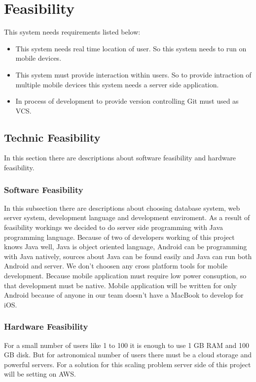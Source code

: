 \chapter{Feasibility}
This system needs requirements listed below:
\begin{itemize}
    \item This system needs real time location of user. So this system needs to run on mobile devices.
    \item This system must provide interaction within users. So to provide intraction of multiple mobile devices this system needs a server side application.
    \item In process of development to provide version controlling Git must used as VCS.
\end{itemize}

\section{Technic Feasibility}
In this section there are descriptions about software feasibility and hardware feasibility.
\subsection{Software Feasibility}
In this subsection there are descriptions about choosing database system, web server system, development language and development enviroment.
As a result of feasibility workings we decided to do server side programming with Java programming language. Because of two of developers working of this project knows Java well, Java is object oriented language, Android can be programming with Java natively, sources about Java can be found easily and Java can run both Android and server.
We don't choosen any cross platform tools for mobile development. Because mobile application must require low power consuption, so that development must be native.
Mobile application will be written for only Android because of anyone in our team doesn't have a MacBook to develop for iOS.

\subsection{Hardware Feasibility}
For a small number of users like 1 to 100 it is enough to use 1 GB RAM and 100 GB disk. But for astronomical number of users there must be a cloud storage and powerful servers. For a solution for this scaling problem server side of this project will be setting on AWS.


